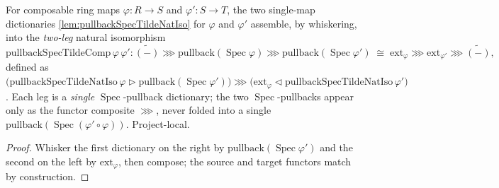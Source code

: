 \begin{lemma}

  \label{lem:pullbackSpecTildeComp}
  For composable ring maps \(\varphi : R \to S\) and \(\varphi' : S \to T\), the two single-map
  dictionaries \cref{lem:pullbackSpecTildeNatIso} for \(\varphi\) and \(\varphi'\) assemble, by
  whiskering, into the \emph{two-leg} natural isomorphism
  \[
    \mathrm{pullbackSpecTildeComp}\,\varphi\,\varphi'
      : \widetilde{(-)} \ggg \mathrm{pullback}(\operatorname{Spec}\varphi)
          \ggg \mathrm{pullback}(\operatorname{Spec}\varphi')
        \;\cong\;
        \mathrm{ext}_{\varphi} \ggg \mathrm{ext}_{\varphi'} \ggg \widetilde{(-)},
  \]
  defined as
  \(\bigl(\mathrm{pullbackSpecTildeNatIso}\,\varphi \rhd
      \mathrm{pullback}(\operatorname{Spec}\varphi')\bigr) \ggg
    \bigl(\mathrm{ext}_{\varphi} \lhd \mathrm{pullbackSpecTildeNatIso}\,\varphi'\bigr)\). Each leg is a
  \emph{single} \(\operatorname{Spec}\)-pullback dictionary; the two \(\operatorname{Spec}\)-pullbacks
  appear only as the functor composite \(\ggg\), never folded into a single
  \(\mathrm{pullback}(\operatorname{Spec}(\varphi'\circ\varphi))\). Project-local.
  \begin{proof}
    Whisker the first dictionary on the right by \(\mathrm{pullback}(\operatorname{Spec}\varphi')\) and
    the second on the left by \(\mathrm{ext}_{\varphi}\), then compose; the source and target functors
    match by construction.
  \end{proof}
\end{lemma}

